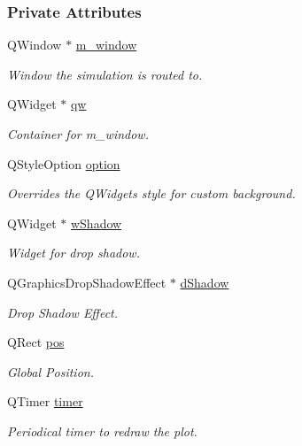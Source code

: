 \subsubsection*{Private Attributes}
\begin{DoxyCompactItemize}
\item 
Q\+Window $\ast$ \mbox{\hyperlink{classPaint_a12c0d1f2f57bd3aea9388f42aa6434f8}{m\+\_\+window}}
\begin{DoxyCompactList}\small\item\em Window the simulation is routed to. \end{DoxyCompactList}\item 
Q\+Widget $\ast$ \mbox{\hyperlink{classPaint_abaab9ddb4a329f78b558793a5f3a84c3}{qw}}
\begin{DoxyCompactList}\small\item\em Container for m\+\_\+window. \end{DoxyCompactList}\item 
Q\+Style\+Option \mbox{\hyperlink{classPaint_ac0f5a8dc0d272705bd7251867e8eabf2}{option}}
\begin{DoxyCompactList}\small\item\em Overrides the Q\+Widget\textquotesingle{}s style for custom background. \end{DoxyCompactList}\item 
Q\+Widget $\ast$ \mbox{\hyperlink{classPaint_a6263fca255c858e9cbf7f549392b9e9e}{w\+Shadow}}
\begin{DoxyCompactList}\small\item\em Widget for drop shadow. \end{DoxyCompactList}\item 
Q\+Graphics\+Drop\+Shadow\+Effect $\ast$ \mbox{\hyperlink{classPaint_adc5781ac10ec78958b8818b46a096914}{d\+Shadow}}
\begin{DoxyCompactList}\small\item\em Drop Shadow Effect. \end{DoxyCompactList}\item 
Q\+Rect \mbox{\hyperlink{classPaint_ad18245bd858cc8c6bd715e56659e3634}{pos}}
\begin{DoxyCompactList}\small\item\em Global Position. \end{DoxyCompactList}\item 
Q\+Timer \mbox{\hyperlink{classPaint_a0cd2955c474cb99795506bdee2df71ab}{timer}}
\begin{DoxyCompactList}\small\item\em Periodical timer to redraw the plot. \end{DoxyCompactList}\item 

\end{DoxyCompactItemize}
